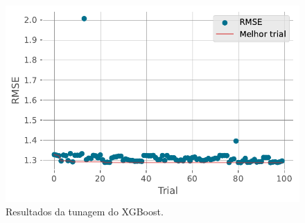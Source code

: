 \documentclass[
  12pt,
  a4paper,
]{scrreprt}
\begin{document}
\begin{figure}
\begin{minipage}{0.33\linewidth}
{\captionsetup{labelsep=none}\includegraphics{TCC_files/figure-pdf/fig-xgb_history-output-1.pdf}

}

\subcaption{\label{fig-xgb_history}}

\end{minipage}%
\newline
\begin{minipage}{\linewidth}


\subcaption{\label{fig-xgb_contour}}

\end{minipage}%

\caption{\label{fig-xgb_param}Resultados da tunagem do XGBoost.}

\end{figure}%
\end{document}
